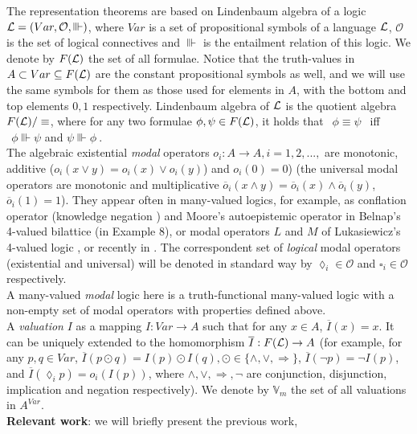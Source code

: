 \documentclass[10pt,twocolumn]{article}
\renewcommand{\O}{\mathcal{O}} \renewcommand{\P}{\mathcal{P}}
\begin{document}
The representation theorems are based on Lindenbaum algebra of a
logic $\L = (Var, \O, \Vvdash)$, where $Var$ is a set of
propositional symbols of a language $\mathcal{L}$, $\O$ is the set of logical
connectives and $\Vvdash$ is the entailment relation of this logic.
We denote by $F(\mathcal{L})$ the set of all formulae. Notice that the
 truth-values in $A \subset Var \subseteq F(\mathcal{L})$ are the constant propositional symbols  as well, and we will use the same symbols for them as those
used for elements in $A$, with the bottom and top elements $0,1$
respectively. Lindenbaum algebra of $\mathcal{L}$ is the quotient algebra
$F(\mathcal{L})/\equiv$, where for any two formulae $\phi, \psi \in F(\mathcal{L})$,
it holds that $~~\phi \equiv \psi~~$ iff $~~\phi \Vvdash \psi$ and
$\psi \Vvdash \phi~$.\\
The   algebraic existential \emph{modal}
operators $o_i:A \rightarrow A, i = 1,2,...,$ are monotonic,
additive ($o_i(x \vee y) = o_i(x) \vee o_i(y)$)
 and $o_i(0) = 0$) (the universal modal operators are monotonic and  multiplicative $\overline{o}_i(x \wedge y) = \overline{o}_i(x) \wedge \overline{o}_i(y)$,
  $\overline{o}_i(1) = 1$).
  They appear often in many-valued logics, for example,
  as conflation operator (knowledge negation \cite{Fitt91})  and Moore's autoepistemic operator \cite{Gins90} in Belnap's 4-valued bilattice \cite{Beln77} (in Example 8),
  or modal operators $L$ and $M$ of Lukasiewicz's 4-valued logic \cite{Luka53,Luka57,MaPr09}, or recently in \cite{GeJo94,Dunn95,DuZh05,Rest05}. The correspondent set of \emph{logical}
modal operators (existential and universal) will be denoted in
  standard way by $\lozenge_i \in \O$ and $\square_i \in \O$ respectively.\\
A many-valued \emph{modal} logic here is a truth-functional many-valued logic with
 a non-empty set of  modal operators with properties defined
 above. \\
 A  \emph{valuation} $I$ as a mapping $I: Var
\rightarrow A$  such that for any $x \in A$, $\overline{I}(x) = x$.
It can be uniquely extended to the homomorphism $\overline{I}: F(\mathcal{L})
\rightarrow A$ (for example,
 for any $p,q \in Var$, $\overline{I}(p \odot q) = I(p) \odot I(q), \odot \in \{\wedge, \vee, \Rightarrow \}$,
 $\overline{I}(\neg p) = \neg I(p)$,  and $\overline{I}(\lozenge_i p) = o_i( I(p))$, where
 $\wedge, \vee, \Rightarrow, \neg$ are conjunction, disjunction, implication and negation respectively). We denote by $\mathbb{V}_m$ the set of all   valuations in $A^{Var}$.\\
\textbf{Relevant work}: we will briefly present the previous work,
\end{document}
